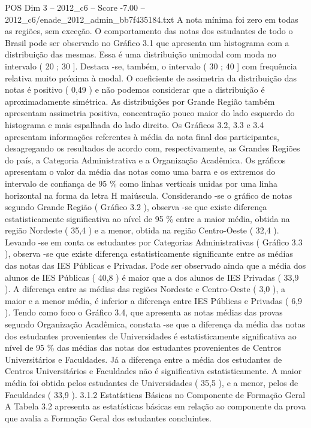\begin{textsample}{POS Dim 3 – 2012\_c6 – Score -7.00 – 2012\_c6/enade\_2012\_admin\_bb7f435184.txt}
A nota mínima foi zero em todas as regiões, sem exceção.
O comportamento das notas dos estudantes de todo o Brasil pode ser observado no Gráfico 3.1 que apresenta um histograma com a distribuição das mesmas.
Essa é uma distribuição unimodal com moda no intervalo ( 20 ; 30 ].
Destaca -se, também, o intervalo ( 30 ; 40 ] com frequência relativa muito próxima à modal.
O coeficiente de assimetria da distribuição das notas é positivo ( 0,49 ) e não podemos considerar que a distribuição é aproximadamente simétrica.
As distribuições por Grande Região também apresentam assimetria positiva, concentração pouco maior do lado esquerdo do histograma e mais espalhada do lado direito.
Os Gráficos 3.2, 3.3 e 3.4 apresentam informações referentes à média da nota final dos participantes, desagregando os resultados de acordo com, respectivamente, as Grandes Regiões do país, a Categoria Administrativa e a Organização Acadêmica.
Os gráficos apresentam o valor da média das notas como uma barra e os extremos do intervalo de confiança de 95 \% como linhas verticais unidas por uma linha horizontal na forma da letra H maiúscula.
Considerando -se o gráfico de notas segundo Grande Região ( Gráfico 3.2 ), observa -se que existe diferença estatisticamente significativa ao nível de 95 \% entre a maior média, obtida na região Nordeste ( 35,4 ) e a menor, obtida na região Centro-Oeste ( 32,4 ).
Levando -se em conta os estudantes por Categorias Administrativas ( Gráfico 3.3 ), observa -se que existe diferença estatisticamente significante entre as médias das notas das IES Públicas e Privadas.
Pode ser observado ainda que a média dos alunos de IES Públicas ( 40,8 ) é maior que a dos alunos de IES Privadas ( 33,9 ).
A diferença entre as médias das regiões Nordeste e Centro-Oeste ( 3,0 ), a maior e a menor média, é inferior a diferença entre IES Públicas e Privadas ( 6,9 ).
Tendo como foco o Gráfico 3.4, que apresenta as notas médias das provas segundo Organização Acadêmica, constata -se que a diferença da média das notas dos estudantes provenientes de Universidades é estatisticamente significativa ao nível de 95 \% das médias das notas dos estudantes provenientes de Centros Universitários e Faculdades.
Já a diferença entre a média dos estudantes de Centros Universitários e Faculdades não é significativa estatisticamente.
A maior média foi obtida pelos estudantes de Universidades ( 35,5 ), e a menor, pelos de Faculdades ( 33,9 ). 3.1.2 Estatísticas Básicas no Componente de Formação Geral A Tabela 3.2 apresenta as estatísticas básicas em relação ao componente da prova que avalia a Formação Geral dos estudantes concluintes.

\end{textsample}
